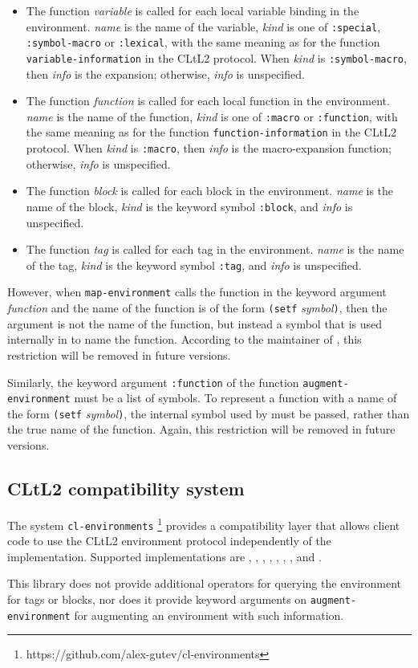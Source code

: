 \begin{itemize}
\item The function \textit{variable} is called for each local variable
  binding in the environment.  \textit{name} is the name of the
  variable, \textit{kind} is one of \texttt{:special},
  \texttt{:symbol-macro} or \texttt{:lexical}, with the same meaning
  as for the function \texttt{variable-information} in the CLtL2
  protocol.  When \textit{kind} is \texttt{:symbol-macro}, then
  \textit{info} is the expansion; otherwise, \textit{info} is
  unspecified.
\item The function \textit{function} is called for each local function
  in the environment. \textit{name} is the name of the function,
  \textit{kind} is one of \texttt{:macro} or \texttt{:function}, with
  the same meaning as for the function \texttt{function-information}
  in the CLtL2 protocol.  When \textit{kind} is \texttt{:macro}, then
  \textit{info} is the macro-expansion function; otherwise,
  \textit{info} is unspecified.
\item The function \textit{block} is called for each block in the
  environment.  \textit{name} is the name of the block, \textit{kind}
  is the keyword symbol \texttt{:block}, and \textit{info} is
  unspecified.
\item The function \textit{tag} is called for each tag in the
  environment.  \textit{name} is the name of the tag, \textit{kind}
  is the keyword symbol \texttt{:tag}, and \textit{info} is
  unspecified.
\end{itemize}

However, when \texttt{map-environment} calls the function in the
keyword argument \textit{function} and the name of the function is of
the form \texttt{(setf} \textit{symbol}\texttt{)}, then the argument
is not the name of the function, but instead a symbol that is used
internally in \lispworks{} to name the function.  According to the
maintainer of \lispworks{}, this restriction will be removed in future
versions.

Similarly, the keyword argument \texttt{:function} of the function
\texttt{augment-environment} must be a list of symbols.  To represent
a function with a name of the form \texttt{(setf}
\textit{symbol}\texttt{)}, the internal symbol used by \lispworks{}
must be passed, rather than the true name of the function.  Again,
this restriction will be removed in future versions.

\subsection{CLtL2 compatibility system}

The system \texttt{cl-environments}%
\footnote{https://github.com/alex-gutev/cl-environments}
provides a compatibility layer that allows client code to use the
CLtL2 environment protocol independently of the \commonlisp{}
implementation.  Supported \commonlisp{} implementations are \clisp{},
\ccl{}, \ecl{}, \abcl{}, \cmucl{}, \sbcl{}, \allegro{}, and
\lispworks{}.

This library does not provide additional operators for querying the
environment for tags or blocks, nor does it provide keyword arguments
on \texttt{augment-environment} for augmenting an environment with
such information.
